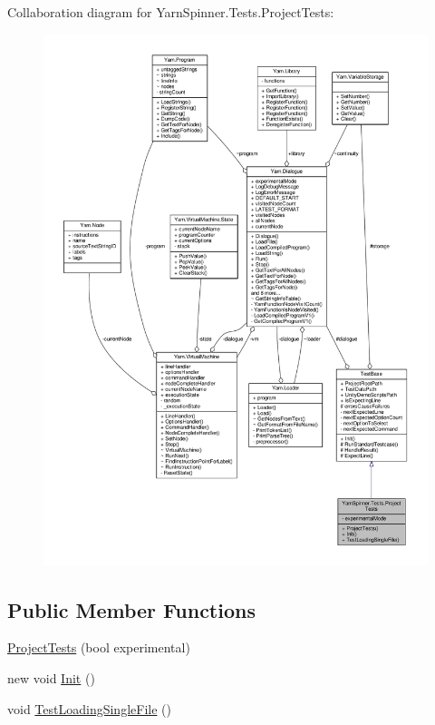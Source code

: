 Collaboration diagram for Yarn\-Spinner.\-Tests.\-Project\-Tests\-:
\nopagebreak
\begin{figure}[H]
\begin{center}
\leavevmode
\includegraphics[width=350pt]{a00826}
\end{center}
\end{figure}
\subsection*{Public Member Functions}
\begin{DoxyCompactItemize}
\item 
\hyperlink{a00156_af8cec595dce7455eeace4841d0f71a35}{Project\-Tests} (bool experimental)
\item 
new void \hyperlink{a00156_a09fb3b241843b94176be710e4a2a6833}{Init} ()
\item 
void \hyperlink{a00156_a7d3dccb3f5ddf0b24e65782b7af15369}{Test\-Loading\-Single\-File} ()
\end{DoxyCompactItemize}
